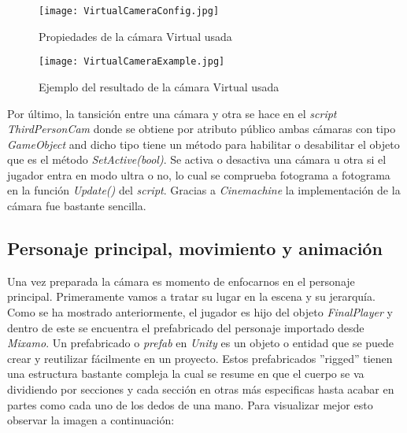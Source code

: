 
   

\begin{figure}[H]
    \centering
    \texttt{[image: VirtualCameraConfig.jpg]}
    \caption{Propiedades de la cámara Virtual usada}
\end{figure}
\begin{figure}[H]
    \centering
    \texttt{[image: VirtualCameraExample.jpg]}
    \caption{Ejemplo del resultado de la cámara Virtual usada}
\end{figure}

Por último, la tansición entre una cámara y otra se hace en el \textit{script} \textit{ThirdPersonCam} donde se obtiene por atributo público ambas cámaras con tipo \textit{GameObject} and dicho tipo tiene un método para habilitar o desabilitar el objeto que es el método \textit{SetActive(bool)}. Se activa o desactiva una cámara u otra si el jugador entra en modo ultra o no, lo cual se comprueba fotograma a fotograma en la función \textit{Update()} del \textit{script}. Gracias a \textit{Cinemachine} la implementación de la cámara fue bastante sencilla.

\subsection{Personaje principal, movimiento y animación} 

Una vez preparada la cámara es momento de enfocarnos en el personaje principal. Primeramente vamos a tratar su lugar en la escena y su jerarquía. Como se ha mostrado anteriormente, el jugador es hijo del objeto \textit{FinalPlayer} y dentro de este se encuentra el prefabricado del personaje importado desde \textit{Mixamo}. Un prefabricado o \textit{prefab} en \textit{Unity}  es un objeto o entidad que se puede crear y reutilizar fácilmente en un proyecto. Estos prefabricados ''rigged'' tienen una estructura bastante compleja la cual se resume en que el cuerpo se va dividiendo por secciones y cada sección en otras más especificas hasta acabar en partes como cada uno de los dedos de una mano. Para visualizar mejor esto observar la imagen a continuación: 

